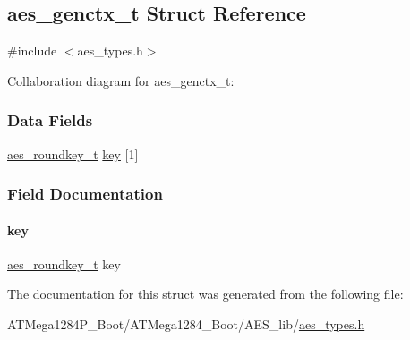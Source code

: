 \hypertarget{structaes__genctx__t}{}\subsection{aes\+\_\+genctx\+\_\+t Struct Reference}
\label{structaes__genctx__t}


{\ttfamily \#include $<$aes\+\_\+types.\+h$>$}



Collaboration diagram for aes\+\_\+genctx\+\_\+t\+:
\subsubsection*{Data Fields}
\begin{DoxyCompactItemize}
\item 
\hyperlink{structaes__roundkey__t}{aes\+\_\+roundkey\+\_\+t} \hyperlink{structaes__genctx__t_a6672cb4e34628eb6be2b940968d92c33}{key} \mbox{[}1\mbox{]}
\end{DoxyCompactItemize}


\subsubsection{Field Documentation}
\mbox{\label{structaes__genctx__t_a6672cb4e34628eb6be2b940968d92c33}} 
\paragraph{\texorpdfstring{key}{key}}
{\footnotesize\ttfamily \hyperlink{structaes__roundkey__t}{aes\+\_\+roundkey\+\_\+t} key}



The documentation for this struct was generated from the following file\+:\begin{DoxyCompactItemize}
\item 
A\+T\+Mega1284\+P\+\_\+\+Boot/\+A\+T\+Mega1284\+\_\+\+Boot/\+A\+E\+S\+\_\+lib/\hyperlink{_a_t_mega1284_p___boot_2_a_t_mega1284___boot_2_a_e_s__lib_2aes__types_8h}{aes\+\_\+types.\+h}\end{DoxyCompactItemize}

